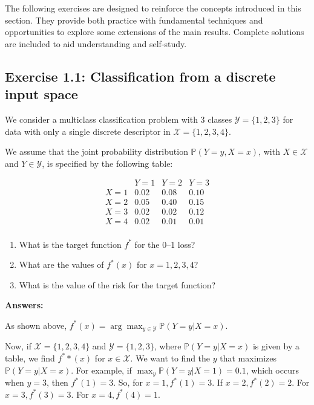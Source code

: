 The following exercises are designed to reinforce the concepts introduced in this section. They provide both practice with fundamental techniques and opportunities to explore some extensions of the main results. Complete solutions are included to aid understanding and self-study.

\subsection*{Exercise 1.1: Classification from a discrete input space}

We consider a multiclass classification problem with 3 classes 
\(\mathcal{Y} = \{1,2,3\}\) for data with only a single discrete descriptor 
in \(\mathcal{X} = \{1,2,3,4\}\).

We assume that the joint probability distribution 
\(\mathbb{P}(Y = y, X = x)\), with \(X \in \mathcal{X}\) and \(Y \in \mathcal{Y}\), 
is specified by the following table:

\[
\begin{array}{c|ccc}
    & Y=1 & Y=2 & Y=3 \\ \hline
X=1 & 0.02 & 0.08 & 0.10 \\
X=2 & 0.05 & 0.40 & 0.15 \\
X=3 & 0.02 & 0.02 & 0.12 \\
X=4 & 0.02 & 0.01 & 0.01 \\
\end{array}
\]

\begin{enumerate}
    \item What is the target function \(f^*\) for the 0--1 loss?
    \item What are the values of \(f^*(x)\) for \(x = 1,2,3,4\)?
    \item What is the value of the risk for the target function?
\end{enumerate}

\textbf{Answers:}
\vspace{0.2cm}

As shown above, $f^*(x) = \arg\max_{y \in \mathcal{Y}} \mathbb{P}(Y=y | X=x)$.

\vspace{0.2cm}

Now, if $\mathcal{X} = \{1, 2, 3, 4\}$ and $\mathcal{Y} = \{1, 2, 3\}$, where $\mathbb{P}(Y=y | X=x)$ is given by a table, we find $f^**(x)$ for $x \in \mathcal{X}$. We want to find the $y$ that maximizes $\mathbb{P}(Y=y|X=x)$.
For example, if $\max_y \mathbb{P}(Y=y|X=1) = 0.1$, which occurs when $y=3$, then $f^*(1)=3$. So, for $x=1, f^*(1)=3$. If $x=2, f^*(2)=2$. For $x=3, f^*(3)=3$. For $x=4, f^*(4)=1$.

